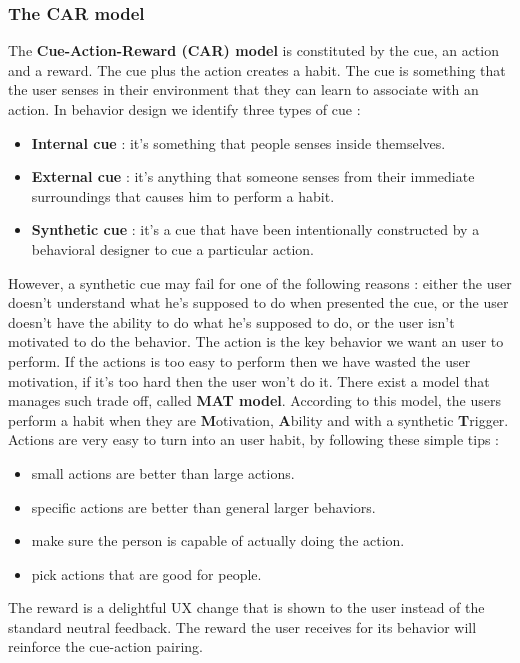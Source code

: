 \documentclass[11pt]{article}
\begin{document}
\subsubsection{The CAR model}
The \textbf{Cue-Action-Reward (CAR) model} is constituted by the cue, an action and a reward. The cue plus the action creates a habit. The cue is something that the user senses in their environment that they can learn to associate with an action. In behavior design we identify three types of cue : 

\begin{itemize}
\item \textbf{Internal cue} : it's something that people senses inside themselves.
\item \textbf{External cue} : it's anything that someone senses from their immediate surroundings that causes him to perform a habit.
\item \textbf{Synthetic cue} : it's a cue that have been intentionally constructed by a behavioral designer to cue a particular action.
\end{itemize}

However, a synthetic cue may fail for one of the following reasons : either the user doesn't understand what he's supposed to do when presented the cue, or the user doesn't have the ability to do what he's supposed to do, or the user isn't motivated to do the behavior. The action is the key behavior we want an user to perform. If the actions is too easy to perform then we have wasted the user motivation, if it's too hard then the user won't do it. There exist a model that manages such trade off, called \textbf{MAT model}. According to this model, the users perform a habit when they are \textbf{M}otivation, \textbf{A}bility and with a synthetic \textbf{T}rigger. Actions are very easy to turn into an user habit, by following these simple tips :

\begin{itemize}
\item small actions are better than large actions.
\item specific actions are better than general larger behaviors.
\item make sure the person is capable of actually doing the action.
\item pick actions that are good for people.
\end{itemize}

The reward is a delightful UX change that is shown to the user instead of the standard neutral feedback. The reward the user receives for its behavior will reinforce the cue-action pairing. 
\end{document}
